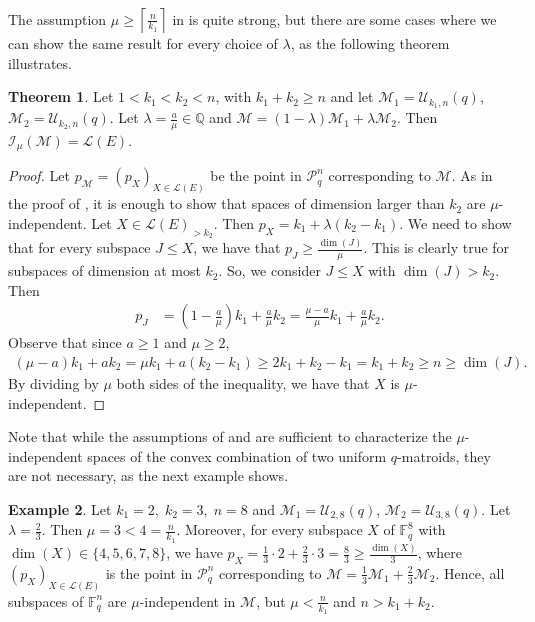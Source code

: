 \documentclass[a4paper,11pt,reqno]{amsart}
\theoremstyle{definition}
\newtheorem{theorem}{Theorem}[section]
\newtheorem{example}[theorem]{{{Example}}}
\newcommand{\mM}{\mathcal{M}}
\newcommand{\mL}{\mathcal{L}}
\newcommand{\mU}{\mathcal{U}}
\newcommand{\mI}{\mathcal{I}}
\newcommand{\F}{\mathbb F}
\newcommand{\RP}{\mathcal{P}_q^n}
\begin{document}
{The assumption $\mu\geq \left\lceil \frac{n}{k_1}\right\rceil$ in  is quite strong, but there are some cases where we can show the same result for every choice of $\lambda$, as the following theorem illustrates. 

\begin{theorem}\label{thm: mu_indep_uniform2}
 Let $1< k_1<k_2<n$, with $k_1+k_2\geq n$ and
let $\mM_1=\mU_{k_1,n}(q)$, $\mM_2=\mU_{k_2,n}(q)$. Let $\lambda=\frac{a}{\mu}\in\mathbb{Q}$ and $\mM=(1-\lambda)\mM_1+\lambda\mM_2$. Then $\mI_\mu(\mM) = \mL(E)$.
\end{theorem}
\begin{proof}
    Let $p_\mM=(p_X)_{X\in\mL(E)}$ be the point in $\RP$ corresponding to $\mM$. As in the proof of , it is enough to show that spaces of dimension larger than $k_2$ are $\mu$-independent. Let $X\in\mL(E)_{>k_2}$.  Then $p_X = k_1+\lambda(k_2-k_1)$. We need to show that for every subspace $J\leq X$, we have that $p_J\geq \frac{\dim(J)}{\mu}$. This is clearly true for subspaces of dimension at most $k_2$. So, we consider $J\leq X$ with $\dim(J)> k_2$. Then 
    \begin{align*}
        p_J &= \left(1-\frac{a}{\mu}\right)k_1 + \frac{a}{\mu} k_2 = \frac{\mu-a}{\mu}k_1 + \frac{a}{\mu}k_2.
    \end{align*} 
    Observe that since $a\geq 1$ and $\mu\geq 2$,
    \begin{align*}
        (\mu-a)k_1+ak_2 = \mu k_1 +a(k_2-k_1) \geq 2k_1 + k_2-k_1 = k_1+k_2 \geq n \geq \dim(J).
    \end{align*}
    By dividing by $\mu$ both sides of the inequality, we have that $X$ is $\mu$-independent.
\end{proof}

Note that while the assumptions of  and  are sufficient to characterize the $\mu$-independent spaces of the convex combination of two uniform $q$-matroids, they are not necessary, as the next example shows.

\begin{example}\label{ex:unif_sum}
    Let $k_1=2, \; k_2=3, \; n=8$ and $\mM_1=\mU_{2,8}(q)$,   $\mM_2=\mU_{3,8}(q)$. Let $\lambda=\frac{2}{3}$. Then $\mu=3< 4=\frac{n}{k_1}$. Moreover, for every subspace $X$ of $\F_q^8$ with $\dim(X)\in\{4,5,6,7,8\}$, we have 
    $p_X = \frac{1}{3}\cdot 2 +\frac{2}{3}\cdot 3 = \frac{8}{3}\geq \frac{\dim(X)}{3}$, where $(p_X)_{X\in\mL(E)}$ is the point in $\RP$ corresponding to $\mM=\frac{1}{3}\mM_1 + \frac{2}{3}\mM_2$. Hence, all subspaces of $\F_q^n$ are $\mu$-independent in $\mM$, but $\mu<\frac{n}{k_1}$ and $n> k_1+k_2$.
\end{example}

}
\end{document}
